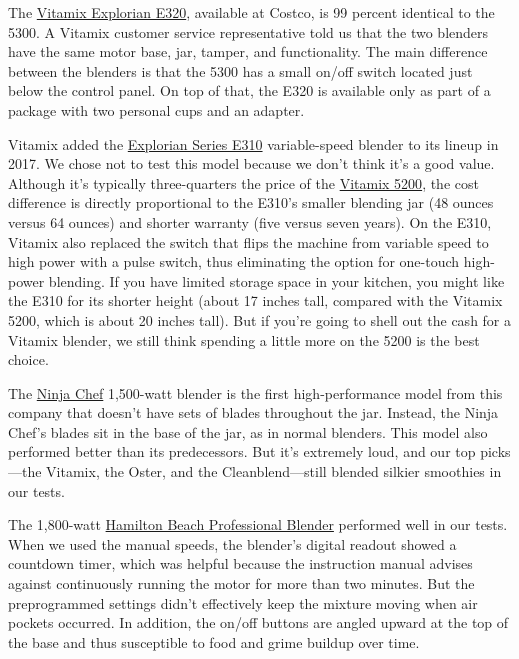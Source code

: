 The
\href{https://www.nytimes3xbfgragh.onion/wirecutter/out/link/29477/159139/4/109202/?merchant=Costco}{Vitamix
Explorian E320}, available at Costco, is 99 percent identical to the
5300. A Vitamix customer service representative told us that the two
blenders have the same motor base, jar, tamper, and functionality. The
main difference between the blenders is that the 5300 has a small on/off
switch located just below the control panel. On top of that, the E320 is
available only as part of a package with two personal cups and an
adapter.

Vitamix added the
\href{https://www.nytimes3xbfgragh.onion/wirecutter/out/link/26098/137761/4/74159/?merchant=Amazon}{Explorian
Series E310} variable-speed blender to its lineup in 2017. We chose not
to test this model because we don't think it's a good value. Although
it's typically three-quarters the price of the
\protect\hyperlink{our-pick-vitamix-5200}{Vitamix 5200}, the cost
difference is directly proportional to the E310's smaller blending jar
(48 ounces versus 64 ounces) and shorter warranty (five versus seven
years). On the E310, Vitamix also replaced the switch that flips the
machine from variable speed to high power with a pulse switch, thus
eliminating the option for one-touch high-power blending. If you have
limited storage space in your kitchen, you might like the E310 for its
shorter height (about 17 inches tall, compared with the Vitamix 5200,
which is about 20 inches tall). But if you're going to shell out the
cash for a Vitamix blender, we still think spending a little more on the
5200 is the best choice.

The
\href{https://www.nytimes3xbfgragh.onion/wirecutter/out/link/24354/130080/4/109203/?merchant=Amazon}{Ninja
Chef} 1,500-watt blender is the first high-performance model from this
company that doesn't have sets of blades throughout the jar. Instead,
the Ninja Chef's blades sit in the base of the jar, as in normal
blenders. This model also performed better than its predecessors. But
it's extremely loud, and our top picks---the Vitamix, the Oster, and the
Cleanblend---still blended silkier smoothies in our tests.

The 1,800-watt
\href{https://www.nytimes3xbfgragh.onion/wirecutter/out/link/24355/130081/4/69785/?merchant=Amazon}{Hamilton
Beach Professional Blender} performed well in our tests. When we used
the manual speeds, the blender's digital readout showed a countdown
timer, which was helpful because the instruction manual advises against
continuously running the motor for more than two minutes. But the
preprogrammed settings didn't effectively keep the mixture moving when
air pockets occurred. In addition, the on/off buttons are angled upward
at the top of the base and thus susceptible to food and grime buildup
over time.

